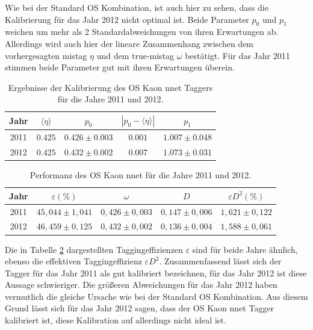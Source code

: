 Wie bei der Standard OS Kombination, ist auch hier zu sehen, dass die Kalibrierung für das Jahr \num{2012} nicht optimal ist. Beide Parameter $p_0$ und $p_1$ weichen um mehr als \num{2} Standardabweichungen von ihren Erwartungen ab. Allerdings wird auch hier der lineare Zusammenhang zwischen dem vorhergesagten mistag $\eta$ und dem true-mistag $\omega$ bestätigt. Für das Jahr \num{2011} stimmen beide Parameter gut mit ihren Erwartungen überein.  
\begin{table}[htbp]
	\centering
	\caption{Ergebnisse der Kalibrierung des OS Kaon nnet Taggers für die Jahre \num{2011} und \num{2012}.}
	\label{tab:result_OSKaonNN}
	\begin{tabular}{ccccc}
	\toprule
       Jahr & $\langle\eta\rangle$ & $p_0$ & $\left|p_0-\langle\eta\rangle\right|$ & $p_1$ \\ 
       \midrule 
	2011 & $0{.}425$ & $0{.}426\pm0{.}003$ & $0{.}001$ & $1{.}007\pm0{.}048$ \\
   2012 & $0{.}425$ & $0{.}432\pm0{.}002$ & $0{.}007$ & $1{.}073\pm0{.}031$ \\ 
   \bottomrule
	\end{tabular}
\end{table}
\begin{table}[htbp]
	\centering
	\caption{Performanz des OS Kaon nnet für die Jahre \num{2011} und \num{2012}.}
	\label{tab:performance_OSKaonNN}
	\begin{tabular}{ccccc}
	\toprule
       Jahr & $\varepsilon(\%)$ & $\omega$ & $D$ & $\varepsilon D^2(\%)$ \\ 
       \midrule
       2011 & $45{,}044\pm1{,}041$& $0{,}426\pm0{,}003$ & $0{,}147\pm0{,}006$ & $1{,}621\pm0{,}122$\\
     2012 & $46{,}459\pm0{,}125$& $0{,}432\pm0{,}002$ & $0{,}136\pm0{,}004$ & $1{,}588\pm0{,}061$\\ 
     \bottomrule
  \end{tabular}
\end{table}
Die in Tabelle \ref{tab:performance_OSKaonNN} dargestellten Taggingeffizienzen $\varepsilon$ sind für beide Jahre ähnlich, ebenso die effektiven Taggingeffizienz $\varepsilon D^2$. Zusammenfassend lässt sich der Tagger für das Jahr \num{2011} als gut kalibriert bezeichnen, für das Jahr \num{2012} ist diese Aussage schwieriger. Die größeren Abweichungen für das Jahr \num{2012} haben vermutlich die gleiche Ursache wie bei der Standard OS Kombination. Aus diesem Grund lässt sich für das Jahr \num{2012} sagen, dass der OS Kaon nnet Tagger kalibriert ist, diese Kalibration auf \BdToDpi allerdings nicht ideal ist.   

